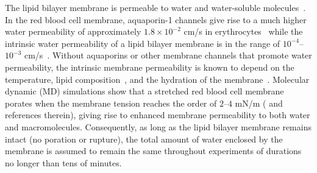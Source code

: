 \documentclass[9pt,twocolumn,twoside,lineno]{pnas-new}
\begin{document}
The lipid bilayer membrane is permeable to water and water-soluble
molecules~\cite{Dick1964_JTB, FettiplaceHaydon1980_PhysRev,
DeamerBramhall1986_ChemPhysLipids, Grafmueller2019_ABLS}. 
%
%
In the red blood cell membrane, aquaporin-1 channels give rise to a much
higher water permeability of approximately $1.8\times 10^{-2}$ cm/s in
erythrocytes~\cite{YangMaVerkman2001_JBC} while the intrinsic water
permeability of a lipid bilayer membrane is in the range of
$10^{-4}$--$10^{-3}$ cm/s~\cite{ThompsonHuang1966_ANYAS,
FettiplaceHaydon1980_PhysRev, Grafmueller2019_ABLS, Dimova2020_GVB,
BhatiaRobinsonDimova2020_SoftMatt}. 
Without aquaporins or other membrane channels that promote water
permeability, the intrinsic membrane permeability is known to depend on the
temperature, lipid composition~\cite{OlbrichRawiczNeedhamEtAl2000_BJ},
and the hydration of the membrane~\cite{MarrinkBerendsen1994_JPhysChem}.
%
Molecular dynamic (MD) simulations show that a stretched red blood cell
membrane porates when the membrane tension reaches the order of $2$--$4$
mN/m (\cite{RazizadehNikfarPaulLiu2020_BJ} and references therein),
giving rise to enhanced membrane permeability to both water and
macromolecules. Consequently, as long as the lipid bilayer membrane
remains intact (no poration or rupture), the total amount of water enclosed by the membrane 
is assumed to remain the same throughout experiments of durations
no longer than tens of minutes.
%
\end{document}
